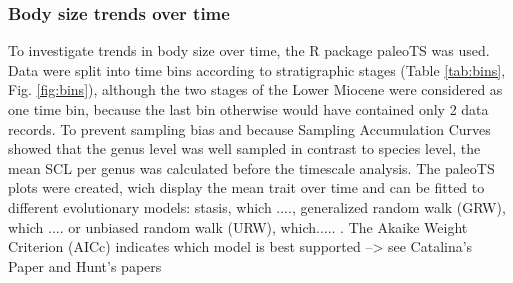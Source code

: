 \subsubsection{Body size trends over time}
To investigate trends in body size over time, the R package paleoTS \citep{Hunt2015a} was used. Data were split into time bins according to stratigraphic stages (Table \ref{tab:bins}, Fig. \ref{fig:bins}), although the two stages of the Lower Miocene were considered as one time bin, because the last bin otherwise would have contained only 2 data records. To prevent sampling bias and because Sampling Accumulation Curves showed that the genus level was well sampled in contrast to species level, the mean SCL per genus was calculated before the timescale analysis. The paleoTS plots were created, wich display the mean trait over time and can be fitted to different evolutionary models: stasis, which ...., generalized random walk (GRW), which .... or unbiased random walk (URW), which..... . The Akaike Weight Criterion (AICc) indicates which model is best supported --> see Catalina's Paper and Hunt's papers


\FloatBarrier
